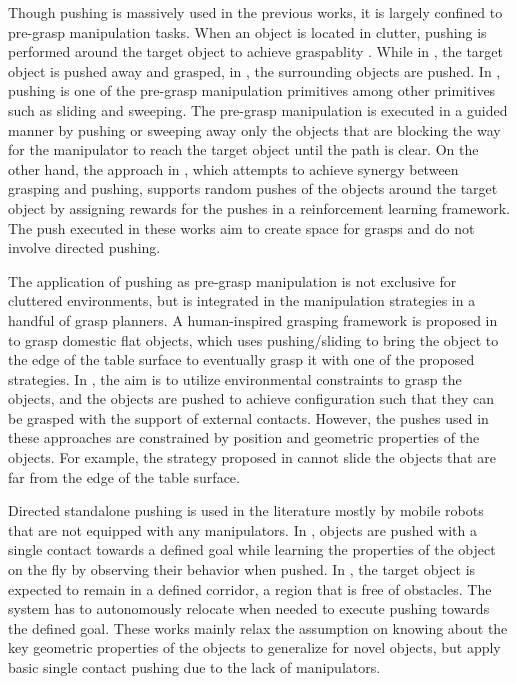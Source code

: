 \documentclass[rnd]{mas_proposal}
\begin{document}
Though pushing is massively used in the previous works, it is largely confined to pre-grasp manipulation tasks. When an object is located in clutter, pushing is performed around the target object to achieve graspablity \cite{dogar2010push, zeng2018learning, dogar2011framework} .  While in \cite{dogar2010push}, the target object is pushed away and grasped, in \cite{zeng2018learning, dogar2011framework}, the surrounding objects are pushed. In \cite{dogar2011framework}, pushing is one of the pre-grasp manipulation primitives among other primitives such as sliding and sweeping. The pre-grasp manipulation is executed in a guided manner by pushing or sweeping away only the objects that are blocking the way for the manipulator to reach the target object until the path is clear. On the other hand, the approach in \cite{zeng2018learning}, which attempts to achieve synergy between grasping and pushing, supports random pushes of the objects around the target object by assigning rewards for the pushes in a reinforcement learning framework. The push executed in these works aim to create space for grasps and do not involve directed pushing. 

The application of pushing as pre-grasp manipulation is not exclusive for cluttered environments, but is integrated in the manipulation strategies in a handful of grasp planners. A human-inspired grasping framework is proposed in \cite{sarantopoulos2018human} to grasp domestic flat objects, which uses pushing/sliding to bring the object to the edge of the table surface to eventually grasp it with one of the proposed strategies. In \cite{eppner2015planning}, the aim is to utilize environmental constraints to grasp the objects, and the objects are pushed to achieve configuration such that they can be grasped with the support of external contacts. However, the pushes used in these approaches are constrained by position and geometric properties of the objects. For example, the strategy proposed in \cite{sarantopoulos2018human} cannot slide the objects that are far from the edge of the table surface.

Directed standalone pushing is used in the literature mostly by mobile robots that are not equipped with any manipulators. In \cite{krivic2018online, krivic2016robust}, objects are pushed with a single contact towards a defined goal while learning the properties of the object on the fly by observing their behavior when pushed. In \cite{krivic2016robust}, the target object is expected to remain in a defined corridor, a region that is free of obstacles. The system has to autonomously relocate when needed to execute pushing towards the defined goal. These works mainly relax the assumption on knowing about the key geometric properties of the objects to generalize for novel objects, but apply basic single contact pushing due to the lack of manipulators.
\end{document}
